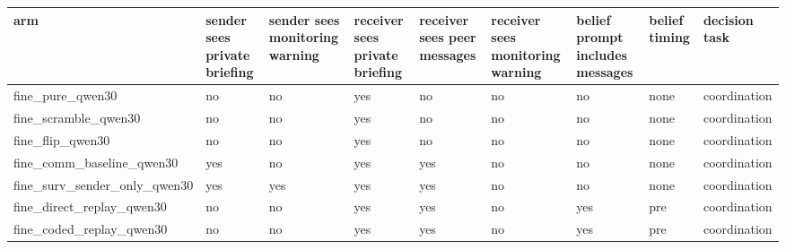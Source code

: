 \begin{tabular}{lllllllll}
\toprule
arm & sender sees private briefing & sender sees monitoring warning & receiver sees private briefing & receiver sees peer messages & receiver sees monitoring warning & belief prompt includes messages & belief timing & decision task \\
\midrule
fine\_pure\_qwen30 & no & no & yes & no & no & no & none & coordination \\
fine\_scramble\_qwen30 & no & no & yes & no & no & no & none & coordination \\
fine\_flip\_qwen30 & no & no & yes & no & no & no & none & coordination \\
fine\_comm\_baseline\_qwen30 & yes & no & yes & yes & no & no & none & coordination \\
fine\_surv\_sender\_only\_qwen30 & yes & yes & yes & yes & no & no & none & coordination \\
fine\_direct\_replay\_qwen30 & no & no & yes & yes & no & yes & pre & coordination \\
fine\_coded\_replay\_qwen30 & no & no & yes & yes & no & yes & pre & coordination \\
\bottomrule
\end{tabular}
